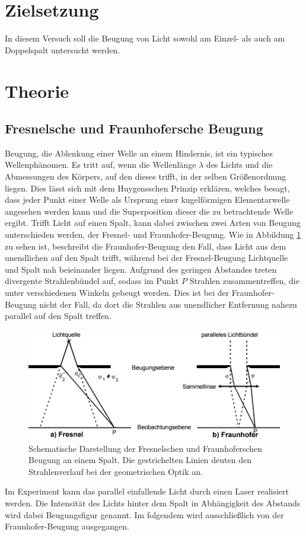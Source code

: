 \section{Zielsetzung}
\label{sec:Zielsetzung}

In diesem Versuch soll die Beugung von Licht sowohl am Einzel- als auch am Doppelspalt untersucht werden.

\section{Theorie}
\subsection{Fresnelsche und Fraunhofersche Beugung} \label{sec:FFB}
Beugung, die Ablenkung einer Welle an einem Hindernis, ist ein typisches Wellenphänomen.
Es tritt auf, wenn die Wellenlänge $\lambda$ des Lichts und die Abmessungen des Körpers, auf den dieses trifft, in der selben Größenordnung liegen. Dies lässt sich mit dem
Huygensschen Prinzip erklären, welches besagt, dass jeder Punkt einer Welle als Ursprung einer kugelförmigen Elementarwelle angesehen werden kann und die Superposition dieser
die zu betrachtende Welle ergibt. \newline
Trifft Licht auf einen Spalt, kann  dabei zwischen zwei Arten von Beugung unterschieden werden, der Fresnel- und Fraunhofer-Beugung.
Wie in Abbildung \ref{fig:beu} zu sehen ist, beschreibt die Fraunhofer-Beugung den Fall, dass Licht aus dem unendlichen auf den Spalt trifft, während
bei der Fresnel-Beugung Lichtquelle und Spalt nah beieinander liegen.  \newline
Aufgrund des geringen Abstandes treten divergente Strahlenbündel auf, sodass im Punkt $P$
Strahlen zusammentreffen, die unter verschiedenen Winkeln gebeugt werden. Dies ist bei der Fraunhofer-Beugung nicht der Fall, da dort die Strahlen aus unendlicher Entfernung nahezu parallel auf den
Spalt treffen.
\begin{figure}[H]
  \centering
  \includegraphics[width=\linewidth-30pt,height=\textheight-30pt,keepaspectratio]{Text/Bilder/Beugung.PNG}
  \caption{Schematische Darstellung der Fresnelschen und Fraunhoferschen Beugung an einem Spalt. Die gestrichelten Linien deuten den
Strahlenverlauf bei der geometrischen Optik an. \cite[31]{sample}}
  \label{fig:beu}
\end{figure}
Im Experiment kann das parallel einfallende Licht durch einen Laser realisiert werden.
Die Intensität des Lichts hinter dem Spalt in Abhängigkeit des Abstands wird dabei Beugungsfigur genannt.
Im folgendem wird ausschließlich von der Fraunhofer-Beugung ausgegangen.
